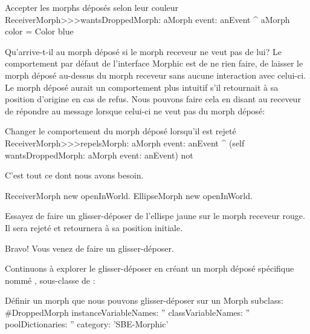 \documentclass[a4paper,10pt,twoside]{book}
\begin{document}
\begin{method}{Accepter les morphs d\'epos\'es selon leur couleur}
ReceiverMorph>>>wantsDroppedMorph: aMorph event: anEvent
	^ aMorph color = Color blue
\end{method}

Qu'arrive-t-il au morph d\'epos\'e si le morph receveur ne veut pas de lui?
Le comportement par d\'efaut de l'interface Morphic est de ne rien
faire, \cad de laisser le morph d\'epos\'e au-dessus du morph receveur
sans aucune interaction avec celui-ci. 
Le morph d\'epos\'e aurait un comportement plus intuitif s'il
retournait \`a sa position d'origine en cas de refus.
Nous pouvons faire cela en disant au receveur de r\'epondre 
au message   lorsque celui-ci ne
veut pas du morph d\'epos\'e:

\begin{method}{Changer le comportement du morph d\'epos\'e lorsqu'il est rejet\'e}
ReceiverMorph>>>repelsMorph: aMorph event: anEvent
	^ (self wantsDroppedMorph: aMorph event: anEvent) not
\end{method}

C'est tout ce dont nous avons besoin.

\begin{code}{}
ReceiverMorph new openInWorld.
EllipseMorph new openInWorld.
\end{code}
\noindent
Essayez de faire un glisser-d\'eposer de l'ellispe jaune
 sur le morph receveur rouge. Il sera rejet\'e et
retournera \`a sa position initiale.


Bravo! Vous venez de faire un glisser-d\'eposer.

Continuons \`a explorer le glisser-d\'eposer en cr\'eant un morph
d\'epos\'e sp\'ecifique nomm\'e ,
sous-classe de :

\begin{classdef}{D\'efinir un morph que nous pouvons glisser-d\'eposer sur un }
Morph subclass: #DroppedMorph
	instanceVariableNames: ''
	classVariableNames: ''
	poolDictionaries: ''
	category: 'SBE-Morphic'
\end{classdef}
\end{document}
